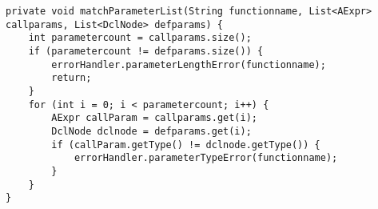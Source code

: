 \begin{lstlisting}[caption={Private helper method for verifying function parameters in FuncStructureVisitor}, label={matchParameterList}]
private void matchParameterList(String functionname, List<AExpr> callparams, List<DclNode> defparams) {
    int parametercount = callparams.size();
    if (parametercount != defparams.size()) {
        errorHandler.parameterLengthError(functionname);
        return;
    }
    for (int i = 0; i < parametercount; i++) {
        AExpr callParam = callparams.get(i);
        DclNode dclnode = defparams.get(i);
        if (callParam.getType() != dclnode.getType()) {
            errorHandler.parameterTypeError(functionname);
        }
    }
}
\end{lstlisting}